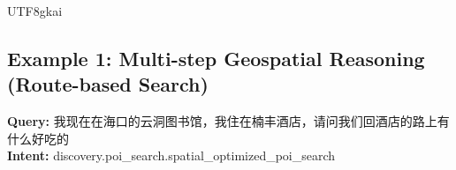 \documentclass{article} %
\begin{document}
\begin{CJK*}{UTF8}{gkai} %


\subsection{Example 1: Multi-step Geospatial Reasoning (Route-based Search)}
\begin{tcolorbox}[
    breakable,
    enhanced,
    colframe=color_amapblue,
    colback=mycolor,
    coltitle=white,
    title = {\textbf{Case Study: Route-based Dining Recommendation}},
    fonttitle=\bfseries
]

\textbf{Query:} 我现在在海口的云洞图书馆，我住在楠丰酒店，请问我们回酒店的路上有什么好吃的\\
\textbf{Intent:} discovery.poi\_search.spatial\_optimized\_poi\_search
\tcblower


\end{tcolorbox}
\end{CJK*}
\end{document}
